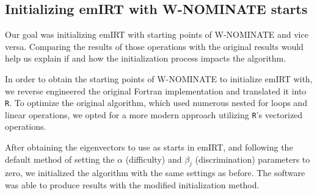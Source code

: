 \documentclass[a4paper,12pt]{report}
\begin{document}
    \subsection{Initializing emIRT with W-NOMINATE starts}\label{subsec:initializing-emirt-with-w-nominate-starts}
    Our goal was initializing emIRT with starting points of W-NOMINATE and vice versa. Comparing the results of
    those operations with the original results would help us explain if and how the initialization process impacts
    the algorithm.

    In order to obtain the starting points of W-NOMINATE to initialize emIRT with, we reverse engineered the
    original Fortran implementation and translated it into \texttt{R}.
    To optimize the original algorithm, which used
    numerous nested for loops and linear operations, we opted for a more modern approach utilizing \texttt{R}'s
    vectorized operations.

    After obtaining the eigenvectors to use as starts in emIRT, and following the default method of setting the
    \(\alpha\) (difficulty) and \(\beta_j\)
    (discrimination) parameters to zero, we initialized the algorithm with the same settings as before. The software
    was able to produce results with the modified initialization method.
\end{document}
